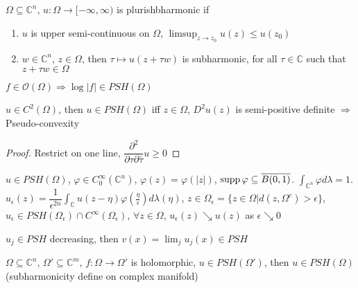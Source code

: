 \documentclass[../main.tex]{subfiles}
\begin{document}
\begin{definition}
$\Omega\subseteq\mathbb C^n$, $u:\Omega\to[-\infty,\infty)$ is plurishbharmonic if
\begin{enumerate}
\item $u$ is upper semi-continuous on $\Omega$, $\limsup_{z\to z_0}u(z)\leq u(z_0)$
\item $w\in\mathbb C^n$, $z\in\Omega$, then $\tau\mapsto u(z+\tau w)$ is subharmonic, for all $\tau\in\mathbb C$ such that $z+\tau w\in\Omega$
\end{enumerate}
\end{definition}

\begin{exercise}
$f\in\mathcal O(\Omega)\Rightarrow \log|f|\in PSH(\Omega)$
\end{exercise}

\begin{theorem}
$u\in C^2(\Omega)$, then $u\in PSH(\Omega)$ iff $z\in\Omega$, $D^2u(z)$ is semi-positive definite $\Rightarrow$ Pseudo-convexity
\end{theorem}

\begin{proof}
Restrict on one line, $\dfrac{\partial^2}{\partial\tau\partial\bar\tau}u\geq0$
\end{proof}

\begin{theorem}
$u\in PSH(\Omega)$, $\varphi\in C^\infty_0(\mathbb C^n)$, $\varphi(z)=\varphi(|z|)$, $\operatorname{supp}\varphi\subseteq\overline{B(0,1)}$. $\int_{\mathbb C^n}\varphi d\lambda=1$. $u_\epsilon(z)=\dfrac{1}{\epsilon^{2n}}\int_{\mathbb C}u(z-\eta)\varphi(\frac{\eta}{\epsilon})d\lambda(\eta)$, $z\in\Omega_\epsilon=\{z\in\Omega|d(z,\Omega^c)>\epsilon\}$, $u_\epsilon\in PSH(\Omega_\epsilon)\cap C^\infty(\Omega_\epsilon)$, $\forall z\in\Omega$, $u_\epsilon(z)\searrow u(z)$ as $\epsilon\searrow0$
\end{theorem}

\begin{proposition}
$u_j\in PSH$ decreasing, then $v(x)=\lim_ju_j(x)\in PSH$
\end{proposition}

\begin{theorem}
$\Omega\subseteq\mathbb C^n$, $\Omega'\subseteq\mathbb C^m$, $f:\Omega\to\Omega'$ is holomorphic, $u\in PSH(\Omega')$, then $u\in PSH(\Omega)$(subharmonicity define on complex manifold)
\end{theorem}
\end{document}
